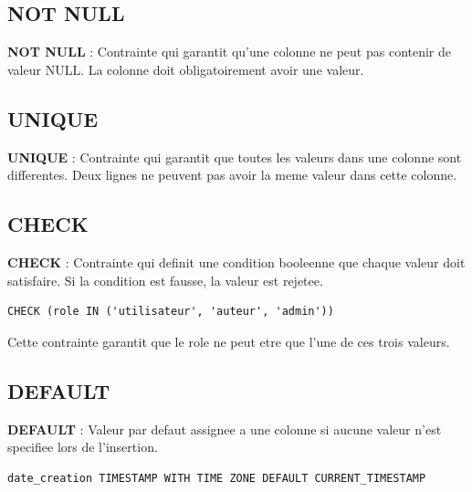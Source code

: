 \documentclass[a4paper,12pt]{book}
\begin{document}
\subsection{NOT NULL}

\begin{definitionbox}
    \textbf{NOT NULL} : Contrainte qui garantit qu'une colonne ne peut pas contenir de valeur NULL. La colonne doit obligatoirement avoir une valeur.
\end{definitionbox}

\subsection{UNIQUE}

\begin{definitionbox}
    \textbf{UNIQUE} : Contrainte qui garantit que toutes les valeurs dans une colonne sont differentes. Deux lignes ne peuvent pas avoir la meme valeur dans cette colonne.
\end{definitionbox}

\subsection{CHECK}

\begin{definitionbox}
    \textbf{CHECK} : Contrainte qui definit une condition booleenne que chaque valeur doit satisfaire. Si la condition est fausse, la valeur est rejetee.
\end{definitionbox}

\begin{lstlisting}[style=sql]
CHECK (role IN ('utilisateur', 'auteur', 'admin'))
\end{lstlisting}

Cette contrainte garantit que le role ne peut etre que l'une de ces trois valeurs.

\subsection{DEFAULT}

\begin{definitionbox}
    \textbf{DEFAULT} : Valeur par defaut assignee a une colonne si aucune valeur n'est specifiee lors de l'insertion.
\end{definitionbox}

\begin{lstlisting}[style=sql]
date_creation TIMESTAMP WITH TIME ZONE DEFAULT CURRENT_TIMESTAMP
\end{lstlisting}
\end{document}

